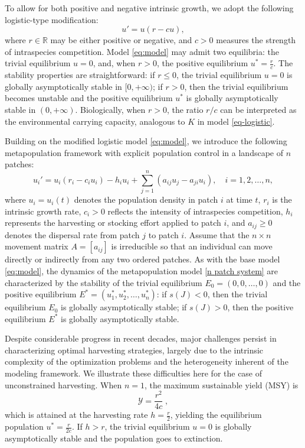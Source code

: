 \documentclass[11pt]{article}
\theoremstyle{definition}
\begin{document}
To allow for both positive and negative intrinsic growth, we adopt the following logistic-type modification:
\begin{equation}
    u'=u(r-cu),
\label{eq:model}\end{equation}
where $r\in \mathbb{R}$ may be either positive or negative, and $c>0$ measures the strength of intraspecies competition. Model \eqref{eq:model} may admit two equilibria: the trivial equilibrium $u=0$, and, when $r>0$, the positive equilibrium $u^*=\frac{r}{c}$. The stability properties are straightforward: if $r\le 0$, the trivial equilibrium $u=0$ is globally asymptotically stable in $[0, +\infty)$; if $r> 0$, then the trivial equilibrium becomes unstable and the positive equilibrium $u^*$ is globally asymptotically stable in $(0,+\infty)$. Biologically, when $r>0$, the ratio $r/c$ can be interpreted as the environmental carrying capacity, analogous to $K$ in model \eqref{eq-logistic}.   



Building on the modified logistic model \eqref{eq:model}, we introduce the following metapopulation framework with explicit population control in a landscape of $n$ patches:
\begin{equation}\label{n patch system}
u_i' = u_i (r_i - c_i u_i) - h_i u_i + \sum_{j=1}^n (a_{ij}u_j - a_{ji} u_i),  \quad i=1,2,\ldots, n,
\end{equation}
where $u_i=u_i(t)$ denotes the population density in patch $i$ at time $t$, $r_i$ is the intrinsic growth rate, $c_i>0$ reflects the intensity of intraspecies competition, $h_i$ represents the harvesting or stocking effort applied to patch $i$, and $a_{ij} \ge 0$ denotes the dispersal rate from patch $j$ to patch $i$. Assume that the $n\times n$ movement matrix $A=[a_{ij}]$ is irreducible so that an individual can move directly or indirectly from any two ordered patches. As with the base model \eqref{eq:model}, the dynamics of the metapopulation model \eqref{n patch system} are characterized by the stability of the trivial equilibrium $E_0=(0,0,\ldots, 0)$ and the positive equilibrium $E^*=(u_1^*, u_2^*, \ldots, u_n^*)$: if $s(J) < 0$, then the trivial equilibrium $E_0$ is globally asymptotically stable; if $s(J)>0$, then the positive equilibrium $E^*$ is globally asymptotically stable. 



Despite considerable progress in recent decades, major challenges persist in {characterizing optimal harvesting strategies, }largely due to the intrinsic complexity of the optimization problems and the heterogeneity inherent of the modeling framework. We illustrate these difficulties here for the case of unconstrained harvesting. When $n=1$, the maximum sustainable yield (MSY) is $$\mathcal{Y}=\frac{r^2}{4c} \; ,$$ 
which is attained at the harvesting rate $h=\frac{r}{2}$, yielding the equilibrium population $u^*=\frac{r}{2c}$. If $h>r$, the trivial equilibrium $u=0$ is globally asymptotically stable and the population goes to extinction. 
\end{document}
